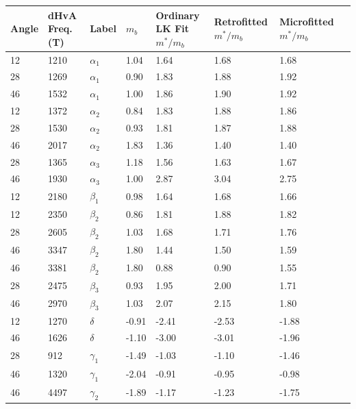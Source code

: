 \begin{center}
    \begin{tabular}[!h]{llllllll}
\toprule
Angle	& dHvA Freq. (\unit{T})	& Label	 & $m_b$	& Ordinary LK Fit $m^*/m_b$	& Retrofitted $m^*/m_b$	& Microfitted $m^*/m_b$ \\
\midrule
12	& 1210	& $\alpha_1$	& 1.04	& 1.64	& 1.68 & 1.68	\\
28	& 1269	& $\alpha_1$	& 0.90	& 1.83	& 1.88 & 1.92	\\
46	& 1532	& $\alpha_1$	& 1.00	& 1.86	& 1.90 & 1.92	\\
12	& 1372	& $\alpha_2$	& 0.84	& 1.83	& 1.88 & 1.86	\\
28	& 1530	& $\alpha_2$	& 0.93	& 1.81	& 1.87 & 1.88	\\
46	& 2017	& $\alpha_2$	& 1.83	& 1.36	& 1.40 & 1.40	\\
28	& 1365	& $\alpha_3$	& 1.18	& 1.56	& 1.63 & 1.67	\\
46	& 1930	& $\alpha_3$	& 1.00	& 2.87	& 3.04 & 2.75	\\
12	& 2180	& $\beta_1$ 	& 0.98	& 1.64	& 1.68 & 1.66	\\
12	& 2350	& $\beta_2$ 	& 0.86	& 1.81	& 1.88 & 1.82	\\
28	& 2605	& $\beta_2$ 	& 1.03	& 1.68	& 1.71 & 1.76	\\
46	& 3347	& $\beta_2$ 	& 1.80	& 1.44	& 1.50 & 1.59	\\
46	& 3381	& $\beta_2$ 	& 1.80	& 0.88	& 0.90 & 1.55	\\
28	& 2475	& $\beta_3$ 	& 0.93	& 1.95	& 2.00 & 1.71	\\
46	& 2970	& $\beta_3$ 	& 1.03	& 2.07	& 2.15 & 1.80	\\
12	& 1270	& $\delta$  	& -0.91	& -2.41	& -2.53& -1.88	 \\
46	& 1626	& $\delta$  	& -1.10	& -3.00	& -3.01& -1.96	 \\
28	& 912	& $\gamma_1$	& -1.49	& -1.03	& -1.10& -1.46	 \\
46	& 1320	& $\gamma_1$	& -2.04	& -0.91	& -0.95& -0.98	 \\
46	& 4497	& $\gamma_2$	& -1.89	& -1.17	& -1.23& -1.75	 \\
\bottomrule
    \end{tabular}
    \label{Table:3:EffectiveMassResults}
    \caption{}
\end{center}
